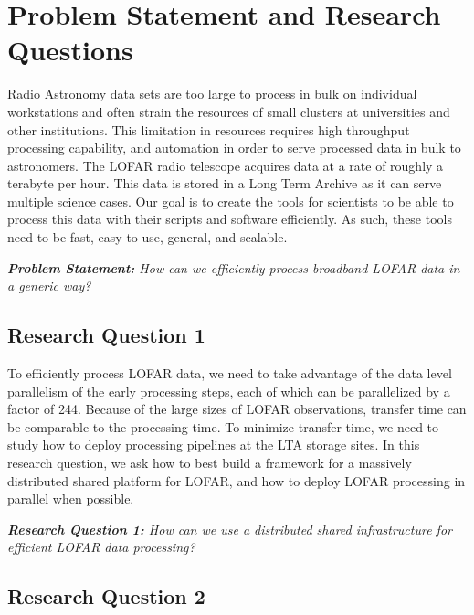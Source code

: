 \section{Problem Statement and Research Questions}

Radio Astronomy data sets are too large to process in bulk on individual workstations and often strain the resources of small clusters at universities and other institutions. This limitation in resources requires high throughput processing capability, and automation in order to serve processed data in bulk to astronomers. The LOFAR radio telescope acquires data at a rate of roughly a terabyte per hour. This data is stored in a Long Term Archive as it can serve multiple science cases. Our goal is to create the tools for scientists to be able to process this data with their scripts and software efficiently. As such, these tools need to be fast, easy to use, general, and scalable. 

\begin{addmargin}[4em]{8em}%
    \emph{\textbf{Problem Statement:} How can we efficiently process broadband LOFAR data in a generic way?} 
\end{addmargin}



\subsection{Research Question 1}

To efficiently process LOFAR data, we need to take advantage of the data level parallelism of the early processing steps, each of which can be parallelized by a factor of 244. Because of the large sizes of LOFAR observations, transfer time can be comparable to the processing time. To minimize transfer time, we need to study how to deploy processing pipelines at the LTA storage sites. In this research question, we ask how to best build a framework for a massively distributed shared platform for LOFAR, and how to deploy LOFAR processing in parallel when possible.

\begin{addmargin}[4em]{8em}%
    \emph{\textbf{Research Question 1:} How can we use a distributed shared infrastructure for efficient LOFAR data processing?}
\end{addmargin}

\subsection{Research Question 2}

